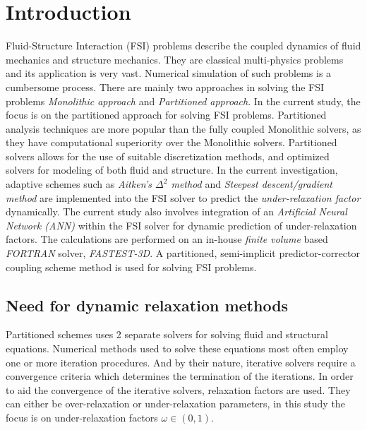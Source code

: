%
% 


\chapter{Introduction}
Fluid-Structure Interaction (FSI) problems describe the coupled dynamics of fluid mechanics and structure mechanics. They are classical multi-physics problems and its application is very vast. Numerical simulation of such problems is a cumbersome process. There are mainly two approaches in solving the FSI problems \textit{Monolithic approach} and \textit{Partitioned approach}. In the current study, the focus is on the partitioned approach for solving FSI problems. Partitioned analysis techniques are more popular than the fully coupled Monolithic solvers, as they have computational superiority over the Monolithic solvers. Partitioned solvers allows for the use of suitable discretization methods, and optimized solvers for modeling of both fluid and structure. In the current investigation, adaptive schemes such as \textit{Aitken's $\Delta^2$ method} and \textit{Steepest descent/gradient method} are implemented into the FSI solver to predict the \textit{under-relaxation factor} dynamically. The current study also involves integration of an \textit{Artificial Neural Network (ANN)} within the FSI solver for dynamic prediction of under-relaxation factors. The calculations are performed on an in-house \textit{finite volume} based \textit{FORTRAN} solver, \textit{FASTEST-3D}. A partitioned, semi-implicit predictor-corrector coupling scheme method is used for solving FSI problems. 

\section{Need for dynamic relaxation methods}
Partitioned schemes uses 2 separate solvers for solving fluid and structural equations. Numerical methods used to solve these equations most often employ one or more iteration procedures. And by their nature, iterative solvers require a convergence criteria which determines the termination of the iterations. In order to aid the convergence of the iterative solvers, relaxation factors are used. They can either be over-relaxation or under-relaxation parameters, in this study the focus is on under-relaxation factors $\omega \in \left(0,1\right)$.\\ 

